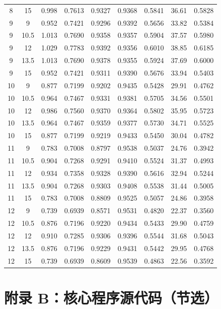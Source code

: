 \documentclass[12pt,a4paper,fontset=fandol]{ctexart}
\begin{document}
\begin{longtable}{ccccccccc}
    8 & 15 & 0.998 & 0.7613 & 0.9327 & 0.9368 & 0.5841 & 36.61 & 0.5828 \\
    9 & 9 & 0.952 & 0.7421 & 0.9296 & 0.9392 & 0.5656 & 33.82 & 0.5384 \\
    9 & 10.5 & 1.013 & 0.7690 & 0.9358 & 0.9357 & 0.5904 & 37.57 & 0.5980 \\
    9 & 12 & 1.029 & 0.7783 & 0.9392 & 0.9356 & 0.6010 & 38.85 & 0.6185 \\
    9 & 13.5 & 1.013 & 0.7690 & 0.9378 & 0.9355 & 0.5924 & 37.69 & 0.6000 \\
    9 & 15 & 0.952 & 0.7421 & 0.9311 & 0.9390 & 0.5676 & 33.94 & 0.5403 \\
    10 & 9 & 0.877 & 0.7199 & 0.9202 & 0.9435 & 0.5428 & 29.91 & 0.4762 \\
    10 & 10.5 & 0.964 & 0.7467 & 0.9331 & 0.9381 & 0.5705 & 34.56 & 0.5501 \\
    10 & 12 & 0.986 & 0.7560 & 0.9370 & 0.9364 & 0.5802 & 35.95 & 0.5723 \\
    10 & 13.5 & 0.964 & 0.7467 & 0.9359 & 0.9377 & 0.5730 & 34.71 & 0.5525 \\
    10 & 15 & 0.877 & 0.7199 & 0.9219 & 0.9433 & 0.5450 & 30.04 & 0.4782 \\
    11 & 9 & 0.783 & 0.7008 & 0.8797 & 0.9538 & 0.5037 & 24.76 & 0.3942 \\
    11 & 10.5 & 0.904 & 0.7268 & 0.9291 & 0.9410 & 0.5524 & 31.37 & 0.4993 \\
    11 & 12 & 0.934 & 0.7358 & 0.9328 & 0.9390 & 0.5616 & 32.94 & 0.5244 \\
    11 & 13.5 & 0.904 & 0.7268 & 0.9303 & 0.9408 & 0.5538 & 31.44 & 0.5005 \\
    11 & 15 & 0.783 & 0.7008 & 0.8809 & 0.9525 & 0.5057 & 24.86 & 0.3958 \\
    12 & 9 & 0.739 & 0.6939 & 0.8571 & 0.9531 & 0.4820 & 22.37 & 0.3560 \\
    12 & 10.5 & 0.876 & 0.7196 & 0.9220 & 0.9434 & 0.5433 & 29.90 & 0.4759 \\
    12 & 12 & 0.910 & 0.7285 & 0.9306 & 0.9396 & 0.5544 & 31.68 & 0.5043 \\
    12 & 13.5 & 0.876 & 0.7196 & 0.9229 & 0.9431 & 0.5442 & 29.95 & 0.4768 \\
    12 & 15 & 0.739 & 0.6939 & 0.8609 & 0.9539 & 0.4863 & 22.56 & 0.3592 \\
\end{longtable}

\section*{附录 B：核心程序源代码（节选）}
\end{document}

